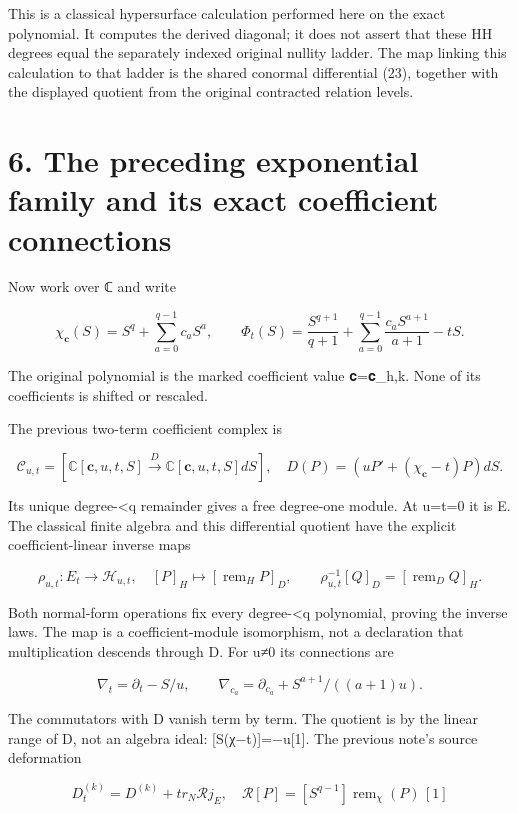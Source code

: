 \documentclass[
  11pt,
]{article}
\begin{document}
This is a classical hypersurface calculation performed here on the exact
polynomial. It computes the derived diagonal; it does not assert that
these HH degrees equal the separately indexed original nullity ladder.
The map linking this calculation to that ladder is the shared conormal
differential (23), together with the displayed quotient from the
original contracted relation levels.

\section{6. The preceding exponential family and its exact coefficient
connections}\label{the-preceding-exponential-family-and-its-exact-coefficient-connections}

Now work over ℂ and write

\[
\chi_{\mathbf c}(S)=S^q+\sum_{a=0}^{q-1}c_aS^a,
\qquad
\Phi_t(S)=\frac{S^{q+1}}{q+1}
 +\sum_{a=0}^{q-1}\frac{c_aS^{a+1}}{a+1}-tS.
\tag{27}
\]

The original polynomial is the marked coefficient value 𝐜=𝐜\_h,k. None
of its coefficients is shifted or rescaled.

The previous two-term coefficient complex is

\[
\mathcal C_{u,t}=[\mathbb C[\mathbf c,u,t,S]\xrightarrow{D}\mathbb C[\mathbf c,u,t,S]dS],
\quad D(P)=(uP'+(\chi_{\mathbf c}-t)P)dS.
\tag{28}
\]

Its unique degree-\textless q remainder gives a free degree-one module.
At u=t=0 it is E. The classical finite algebra and this differential
quotient have the explicit coefficient-linear inverse maps

\[
\rho_{u,t}:E_t\longrightarrow\mathcal H_{u,t},\quad
[P]_H\longmapsto[\operatorname{rem}_H P]_D,
\qquad
\rho_{u,t}^{-1}[Q]_D=[\operatorname{rem}_D Q]_H.
\tag{28a}
\]

Both normal-form operations fix every degree-\textless q polynomial,
proving the inverse laws. The map is a coefficient-module isomorphism,
not a declaration that multiplication descends through D. For u≠0 its
connections are

\[
\nabla_t=\partial_t-S/u,
\qquad
\nabla_{c_a}=\partial_{c_a}+S^{a+1}/((a+1)u).
\tag{29}
\]

The commutators with D vanish term by term. The quotient is by the
linear range of D, not an algebra ideal: {[}S(χ−t){]}=−u{[}1{]}. The
previous note's source deformation

\[
D_t^{(k)}=D^{(k)}+t r_N\mathcal R j_E,
\quad\mathcal R[P]=[S^{q-1}]\operatorname{rem}_\chi(P)\,[1]
\tag{30}
\]
\end{document}
